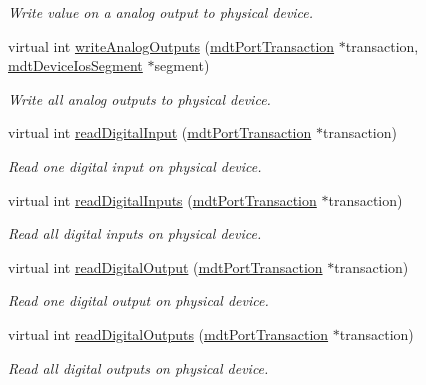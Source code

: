 \begin{DoxyCompactItemize}
\begin{DoxyCompactList}\small\item\em Write value on a analog output to physical device. \end{DoxyCompactList}\item 
virtual int \hyperlink{classmdt_device_a2d82cb0920e4e0628186e59f9b4de7d4}{write\-Analog\-Outputs} (\hyperlink{classmdt_port_transaction}{mdt\-Port\-Transaction} $\ast$transaction, \hyperlink{classmdt_device_ios_segment}{mdt\-Device\-Ios\-Segment} $\ast$segment)
\begin{DoxyCompactList}\small\item\em Write all analog outputs to physical device. \end{DoxyCompactList}\item 
virtual int \hyperlink{classmdt_device_af128b606050035abaf8d049bb2227015}{read\-Digital\-Input} (\hyperlink{classmdt_port_transaction}{mdt\-Port\-Transaction} $\ast$transaction)
\begin{DoxyCompactList}\small\item\em Read one digital input on physical device. \end{DoxyCompactList}\item 
virtual int \hyperlink{classmdt_device_a150e3abae6db5bf1ad11017bf2b76c14}{read\-Digital\-Inputs} (\hyperlink{classmdt_port_transaction}{mdt\-Port\-Transaction} $\ast$transaction)
\begin{DoxyCompactList}\small\item\em Read all digital inputs on physical device. \end{DoxyCompactList}\item 
virtual int \hyperlink{classmdt_device_a1faee6ab31b094731211ea0943544501}{read\-Digital\-Output} (\hyperlink{classmdt_port_transaction}{mdt\-Port\-Transaction} $\ast$transaction)
\begin{DoxyCompactList}\small\item\em Read one digital output on physical device. \end{DoxyCompactList}\item 
virtual int \hyperlink{classmdt_device_aac038c24c3b91757584bdf0d09fb8b02}{read\-Digital\-Outputs} (\hyperlink{classmdt_port_transaction}{mdt\-Port\-Transaction} $\ast$transaction)
\begin{DoxyCompactList}\small\item\em Read all digital outputs on physical device. \end{DoxyCompactList}\item 

\end{DoxyCompactItemize}
